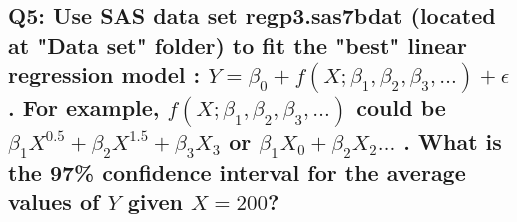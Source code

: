 \documentclass[a4paper,man,natbib]{apa6}
\begin{document}
\subsection*{Q5: Use SAS data set regp3.sas7bdat (located at "Data set" folder) to fit the "best" linear regression model : $Y = \beta_0 + f(X; \beta_1, \beta_2, \beta_3, \ldots) + \epsilon$. For example, $f(X; \beta_1, \beta_2, \beta_3, \ldots)$ could be $\beta_1X^{0.5} + \beta_2 X^{1.5} + \beta_3 X_3$ or $\beta_1X_0 + \beta_2 X_2 \ldots$ . What is the 97\% confidence interval for the average values of $Y$ given $X=200$? }
% 


%
%
\end{document}
